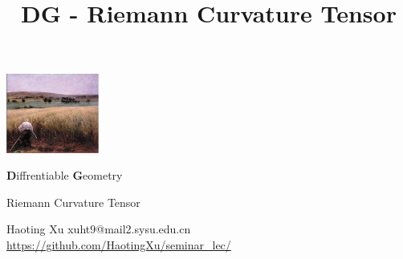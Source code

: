 \documentclass[CJK]{beamer}
\title{DG - Riemann Curvature Tensor}
\author{}
\date{}
\begin{document}
\begin{frame}
 
\begin{center}
\begin{Large}
  \bch
  \begin{center}
\includegraphics[width = 1.2in]{cover}
\end{center}

{\bf D}iffrentiable {\bf G}eometry

{\vskip 0.1in}

Riemann Curvature Tensor

\ech
\end{Large}
\end{center}


\vskip 0.1in
\begin{center}
Haoting Xu
\vskip 0.1in
xuht9@mail2.sysu.edu.cn
\vskip 0.1in
{\tiny \url{https://github.com/HaotingXu/seminar_lec/}}\\
\end{center}


\end{frame}
\end{document}
